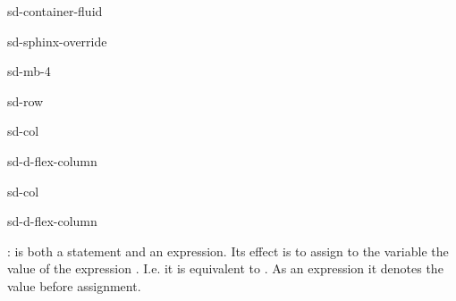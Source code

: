 \documentclass[a4paper,10pt,english]{jupyterBook}
\begin{document}
\begin{sphinxuseclass}{sd-container-fluid}
\begin{sphinxuseclass}{sd-sphinx-override}
\begin{sphinxuseclass}{sd-mb-4}
\begin{sphinxuseclass}{sd-row}
\begin{sphinxuseclass}{sd-col}
\begin{sphinxuseclass}{sd-d-flex-column}
\sphinxAtStartPar
{}

\end{sphinxuseclass}
\end{sphinxuseclass}
\begin{sphinxuseclass}{sd-col}
\begin{sphinxuseclass}{sd-d-flex-column}
\sphinxAtStartPar
{}

\end{sphinxuseclass}
\end{sphinxuseclass}
\end{sphinxuseclass}
\end{sphinxuseclass}
\end{sphinxuseclass}
\end{sphinxuseclass}
\sphinxAtStartPar
{}:  is both a statement and an expression. Its effect is to assign to the variable  the value of the expression . I.e. it is equivalent to . As an expression it denotes the value  before assignment.
\end{document}
